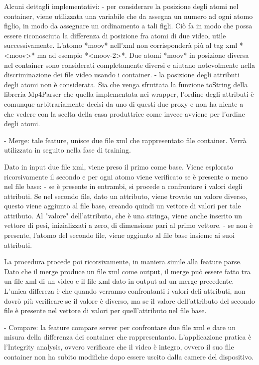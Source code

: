  Alcuni dettagli implementativi:
 - per considerare la posizione degli atomi nel container, viene utilizzata una variabile che da assegna un numero ad ogni atomo figlio, in modo da assegnare un ordinamento a tali figli. Ciò fa in modo che possa essere riconosciuta la differenza di posizione fra atomi di due video, utile successivamente. L'atomo *moov* nell'xml non corrisponderà più al tag xml *<moov>* ma ad esempio *<moov-2>*. Due atomi *moov* in posizione diversa nel container sono considerati completamente diversi e aiutano notevolmente nella discriminazione dei file video usando i container.
 - la posizione degli attributi degli atomi non è considerata. Sia che venga sfruttata la funzione toString della libreria Mp4Parser che quella implementata nei wrapper, l'ordine degli attributi è comunque arbitrariamente decisi da uno di questi due proxy e non ha niente a che vedere con la scelta della casa produttrice come invece avviene per l'ordine degli atomi.


- Merge:
 tale feature, unisce due file xml che rappresentato file container. Verrà utilizzata in seguito nella fase di training.

 Dato in input due file xml, viene preso il primo come base. Viene esplorato ricorsivamente il secondo e per ogni atomo viene verificato se è presente o meno nel file base:
 - se è presente in entrambi, si procede a confrontare i valori degli attributi. Se nel secondo file, dato un attributo, viene trovato un valore diverso, questo viene aggiunto al file base, creando quindi un vettore di valori per tale attributo. Al "valore" dell'attributo, che è una stringa, viene anche inserito un vettore di pesi, inizializzati a zero, di dimensione pari al primo vettore.
 - se non è presente, l'atomo del secondo file, viene aggiunto al file base insieme ai suoi attributi.

 La procedura procede poi ricorsivamente, in maniera simile alla feature parse.
 Dato che il merge produce un file xml come output, il merge può essere fatto tra un file xml di un video e il file xml dato in output ad un merge precedente. L'unica differeza è che quando verranno confrontanti i valori deli attributi, non dovrò più verificare se il valore è diverso, ma se il valore dell'attributo del secondo file è presente nel vettore di valori per quell'attributo nel file base.


- Compare:
 la feature compare server per confrontare due file xml e dare un  misura della differenza dei container che rappresentanto. L'applicazione pratica è l'Integrity analysis, ovvero verificare che il video è integro, ovvero il suo file container non ha subito modifiche dopo essere uscito dalla camere del dispositivo.

